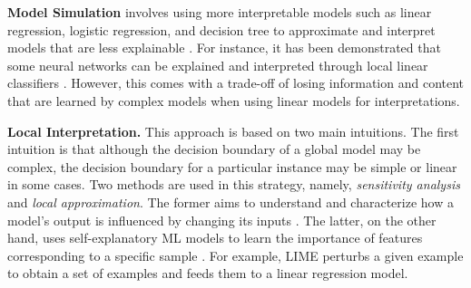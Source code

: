 \noindent \textbf{Model Simulation} involves using more interpretable models such as linear regression, logistic regression, and decision tree to approximate and interpret models that are less explainable \cite{i3, i6, i11, i12, i14, i17, i23, i51}. For instance, it has been demonstrated that some neural networks can be explained and interpreted through local linear classifiers \cite{i11}. However, this comes with a trade-off of losing information and content that are learned by complex models when using linear models for interpretations.

\noindent \textbf{Local Interpretation.}
This approach is based on two main intuitions. The first intuition is that although the decision boundary of a global model may be complex, the decision boundary for a particular instance may be simple or linear in some cases. Two methods are used in this strategy, namely, \textit{sensitivity analysis} and \textit{local approximation}. The former aims to understand and characterize how a model's output is influenced by changing its inputs \cite{i16, i25, i29}. The latter, on the other hand, uses self-explanatory ML models to learn the importance of features corresponding to a specific sample \cite{i20, i22, i31}. For example, LIME \cite{i36} perturbs a given example to obtain a set of examples and feeds them to a linear regression model.

